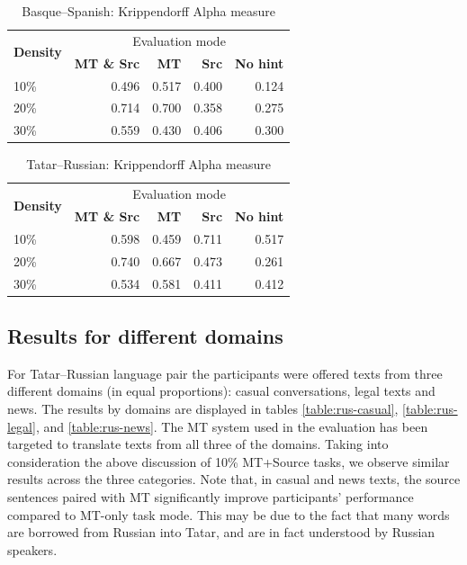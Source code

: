 \documentclass[11pt]{article}
\newcommand{\comment}[1]{\marginpar{\scriptsize\sf \textcolor{blue}{#1}}}
\begin{document}
\begin{table}
\centering
  \begin{tabular}{|l|r|r|r|r|}
  \hline
 \multirow{2}{*}{\textbf{Density}} & \multicolumn{4}{|c|}{Evaluation mode} \\\cline{2-5}
                                            & \textbf{MT \& Src} & \textbf{MT} & \textbf{Src} & \textbf{No hint} \\
\hline
10\%&0.496&0.517&0.400&0.124\\
20\%&0.714&0.700&0.358&0.275\\
30\%&0.559&0.430&0.406&0.300\\

\hline
\end{tabular}
\caption {Basque--Spanish: Krippendorff Alpha measure} 
\label{table:alpha-eus-spa}
\end{table}

\begin{table}
\centering
  \begin{tabular}{|l|r|r|r|r|}
  \hline
 \multirow{2}{*}{\textbf{Density}} & \multicolumn{4}{|c|}{Evaluation mode} \\\cline{2-5}
                                            & \textbf{MT \& Src} & \textbf{MT} & \textbf{Src} & \textbf{No hint} \\
\hline
10\%&0.598&0.459 &0.711 &0.517 \\
20\%&0.740&0.667 &0.473 &0.261 \\
30\%&0.534&0.581 &0.411 &0.412 \\
\hline
\end{tabular}
\caption {Tatar--Russian: Krippendorff Alpha measure} 
\label{table:alpha-tat-rus}
\end{table}

\subsection{Results for different domains}
\comment{EA: and what would we like to say about those? The results depend heavily on the Tatar-Russian system. Do we have to provide info on what vocabulary it handles better, what it has and has not been trained on? Or do we just say that casual texts are easier to fill than legal texts?}
For Tatar--Russian language pair the participants were offered texts from three different domains (in equal proportions): casual conversations, legal texts and news. The results by domains are displayed in tables \ref{table:rus-casual}, \ref{table:rus-legal}, and \ref{table:rus-news}. The MT system used in the evaluation has been targeted to translate texts from all three of the domains. Taking into consideration the above discussion of 10\% MT+Source tasks, we observe similar results across the three categories. Note that, in casual and news texts, the source sentences paired with MT significantly improve participants' performance compared to MT-only task mode. This may be due to the fact that many words are borrowed from Russian into Tatar, and are in fact understood by Russian speakers.
\end{document}
